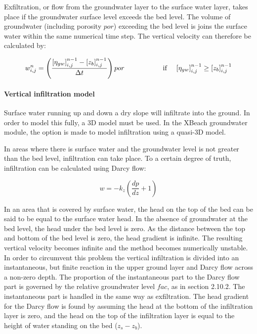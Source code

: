 Exfiltration, or flow from the groundwater layer to the surface water layer, takes place if the groundwater surface level exceeds the bed level. The volume of groundwater (including porosity $por$) exceeding the bed level is joins the surface water within the same numerical time step. The vertical velocity can therefore be calculated by:

\begin{equation} \label{2.86)} 
w_{i,j}^{n} =\left(\frac{\left[\eta _{gw} \right]_{i,j}^{n-1} -\left[z_{b} \right]_{i,j}^{n-1} }{\Delta t} \right)por{\rm \; \; \; \; \; \; \; \; \; \; \; \; \; \; \; \; \; \; \; \; if\; \; \; \; }\left[\eta _{gw} \right]_{i,j}^{n-1} \ge \left[z_{b} \right]_{i,j}^{n-1}  
\end{equation} 

\paragraph{Vertical infiltration model}

Surface water running up and down a dry slope will infiltrate into the ground. In order to model this fully, a 3D model must be used. In the XBeach groundwater module, the option is made to model infiltration using a quasi-3D model. 

In areas where there is surface water and the groundwater level is not greater than the bed level, infiltration can take place. To a certain degree of truth, infiltration can be calculated using Darcy flow:

\begin{equation} \label{2.87)} 
w=-k_{z} \left(\frac{dp}{dz} +1\right) 
\end{equation} 

In an area that is covered by surface water, the head on the top of the bed can be said to be equal to the surface water head. In the absence of groundwater at the bed level, the head under the bed level is zero. As the distance between the top and bottom of the bed level is zero, the head gradient is infinite. The resulting vertical velocity becomes infinite and the method becomes numerically unstable. In order to circumvent this problem the vertical infiltration is divided into an instantaneous, but finite reaction in the upper ground layer and Darcy flow across a non-zero depth. The proportion of the instantaneous part to the Darcy flow part is governed by the relative groundwater level $fac$, as in section 2.10.2. The instantaneous part is handled in the same way as exfiltration. The head gradient for the Darcy flow is found by assuming the head at the bottom of the infiltration layer is zero, and the head on the top of the infiltration layer is equal to the height of water standing on the bed ($z_{s} -z_{b} $). 

